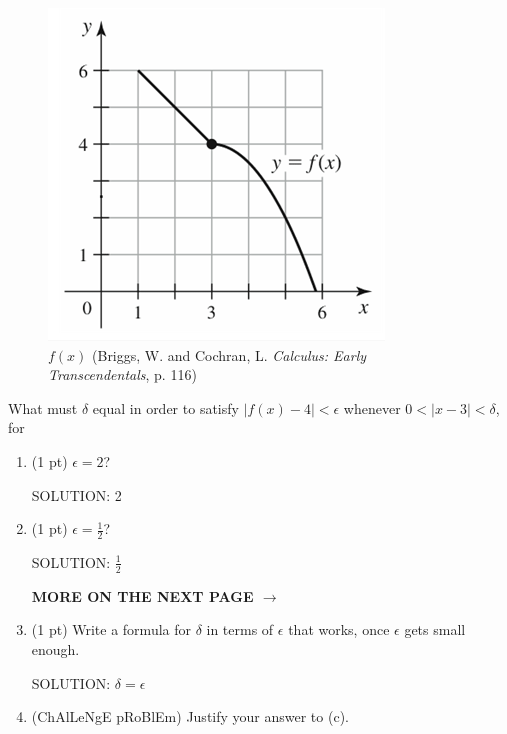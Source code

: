 \documentclass[11pt,letterpaper]{article}
\begin{document}
\begin{enumerate}
\vspace{-1pc}  
\begin{figure}[h]
\begin{center}
\includegraphics[scale=0.6]{Q3pic.png}
\caption{$f(x)$ (Briggs, W. and Cochran, L. \emph{Calculus: Early Transcendentals}, p. 116)}
\end{center}
\end{figure}

\vspace{-0.5pc}
What must $\delta$ equal in order to satisfy $|f(x)-4|<\epsilon$ whenever $0<|x-3|<\delta$, for 
\begin{enumerate}
\item (1 pt) $\epsilon=2$?

\vspace{0.5pc}
SOLUTION: 2

\vspace{0.5pc}
\item (1 pt) $\epsilon=\frac{1}{2}$?

\vspace{0.5pc}
SOLUTION: $\frac{1}{2}$

\hfill {\bf\Large MORE ON THE NEXT PAGE $\to$}

\vspace{0.5pc}
\item (1 pt) Write a formula for $\delta$ in terms of $\epsilon$ that works, once $\epsilon$ gets small enough.

\vspace{0.5pc}
SOLUTION: $\delta=\epsilon$

\vspace{0.5pc}
\item (ChAlLeNgE pRoBlEm) Justify your answer to (c).


\end{enumerate}
\end{enumerate}
\end{document}
